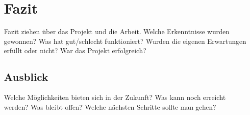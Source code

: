 
\chapter{Fazit}\label{cha:Fazit}
Fazit ziehen über das Projekt und die Arbeit. Welche Erkenntnisse wurden gewonnen? Was hat gut/schlecht funktioniert? Wurden die eigenen Erwartungen erfüllt oder nicht? War das Projekt erfolgreich?

\section{Ausblick}\label{sec:Ausblick}
Welche Möglichkeiten bieten sich in der Zukunft? Was kann noch erreicht werden? Was bleibt offen? Welche nächsten Schritte sollte man gehen?